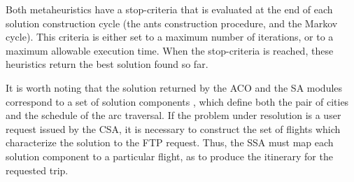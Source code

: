 Both metaheuristics have a stop-criteria that is evaluated at the end of each solution construction cycle (the ants construction procedure, and the Markov cycle). This criteria is either set to a maximum number of iterations, or to a maximum allowable execution time. When the stop-criteria is reached, these heuristics return the best solution found so far. 

It is worth noting that the solution returned by the ACO and the SA modules correspond to a set of solution components 
, which define both the pair of cities and the schedule of the arc traversal. If the problem under resolution is a user request issued by the CSA, it is necessary to construct the set of flights which characterize the solution to the FTP request. Thus, the SSA must map each solution component to a particular flight, as to produce the itinerary for the requested trip. 


                         

